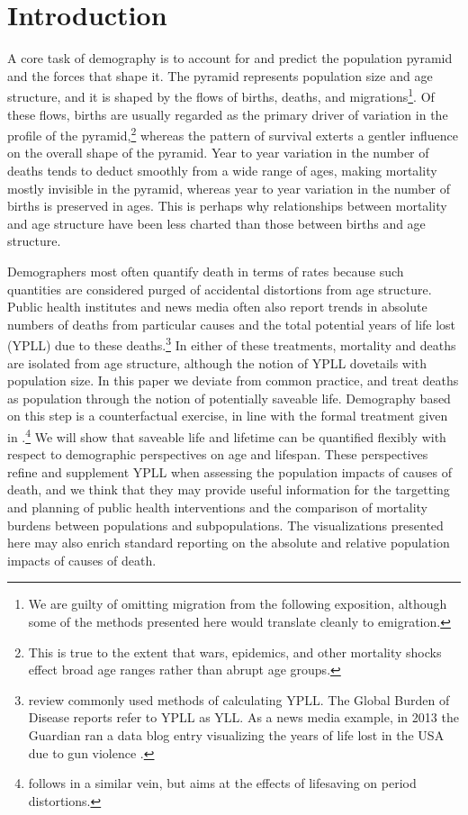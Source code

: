 \documentclass{article}
\begin{document}
\section*{Introduction}
A core task of demography is to account for and predict the population
pyramid and the forces that shape it. The pyramid represents population
size and age structure, and it is shaped by the flows of births,
deaths, and migrations\footnote{We are guilty of omitting migration from
the following exposition, although some of the methods presented here would
translate cleanly to emigration.}. Of these flows, births are usually regarded
as the primary driver of variation in the profile of the pyramid,\footnote{This
is true to the extent that wars, epidemics, and other mortality shocks effect
broad age ranges rather than abrupt age groups.} whereas the pattern of survival
exterts a gentler influence on the overall shape of the pyramid.
Year to year variation in the number of deaths tends to deduct
smoothly from a wide range of ages, making mortality mostly invisible in the pyramid, whereas year to year variation in the number of births is preserved in ages. This is perhaps why 
relationships between mortality and age structure have been less charted than
those between births and age structure. 

Demographers most often quantify death in terms of rates 
because such quantities are considered purged of accidental distortions from
age structure. Public health institutes and news media often also report trends
in absolute numbers of deaths from particular causes and the total potential years of life lost (YPLL) due to
these deaths.\footnote{\citet{gardner1990} review commonly used methods of
calculating YPLL. The Global Burden of Disease reports refer to YPLL as YLL.
As a news media example, in 2013 the Guardian ran a data blog entry
visualizing the years of life lost in the USA due to gun violence
\citep{rogers2013gun}. } In either of these treatments, mortality and deaths are
isolated from age structure, although the notion of YPLL dovetails with
population size. In this paper we deviate from common practice, and treat deaths as population through the notion of potentially saveable
life. Demography based on this step is a counterfactual exercise, in
line with the formal treatment given in
\citet{vaupel1987repeated}.\footnote{\citet{vaupel2008lifesaving} follows in a
similar vein, but aims at the effects of lifesaving on period distortions.} We
will show that saveable life and lifetime can be quantified flexibly with respect to demographic perspectives on age and lifespan. These perspectives refine and supplement YPLL when assessing the population impacts of causes of death, and we
think that they may provide useful information for the targetting and planning
of public health interventions and the comparison of mortality burdens between
populations and subpopulations. The visualizations presented here may also
enrich standard reporting on the absolute and relative population impacts of
causes of death.
\end{document}
